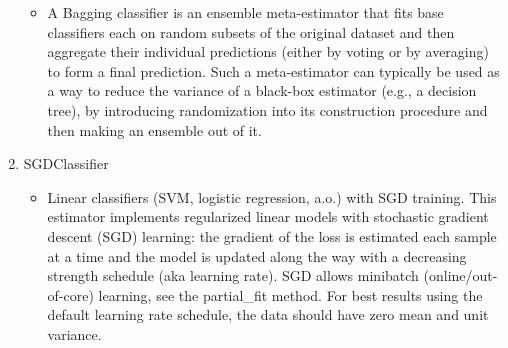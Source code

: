 \begin{enumerate}
\begin{itemize}
            \item A Bagging classifier is an ensemble meta-estimator that fits base classifiers each on random subsets of the original dataset and then aggregate their individual predictions (either by voting or by averaging) to form a final prediction. Such a meta-estimator can typically be used as a way to reduce the variance of a black-box estimator (e.g., a decision tree), by introducing randomization into its construction procedure and then making an ensemble out of it.
        \end{itemize}
    \item SGDClassifier
        \begin{itemize}
            \item Linear classifiers (SVM, logistic regression, a.o.) with SGD training. This estimator implements regularized linear models with stochastic gradient descent (SGD) learning: the gradient of the loss is estimated each sample at a time and the model is updated along the way with a decreasing strength schedule (aka learning rate). SGD allows minibatch (online/out-of-core) learning, see the partial\_fit method. For best results using the default learning rate schedule, the data should have zero mean and unit variance.
        \end{itemize}
\end{enumerate}
